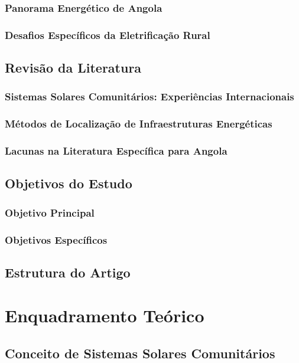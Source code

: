 \documentclass[12pt, a4paper]{article}
\begin{document}
\subsubsection{Panorama Energético de Angola}
\subsubsection{Desafios Específicos da Eletrificação Rural}

\subsection{Revisão da Literatura}
\subsubsection{Sistemas Solares Comunitários: Experiências Internacionais}
\subsubsection{Métodos de Localização de Infraestruturas Energéticas}
\subsubsection{Lacunas na Literatura Específica para Angola}

\subsection{Objetivos do Estudo}
\subsubsection{Objetivo Principal}
\subsubsection{Objetivos Específicos}

\subsection{Estrutura do Artigo}

\section{Enquadramento Teórico}
\subsection{Conceito de Sistemas Solares Comunitários}
\end{document}
